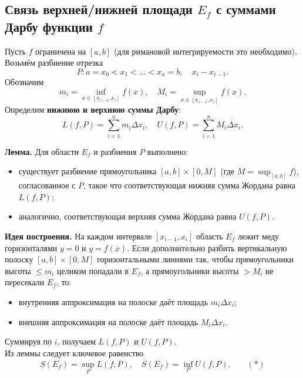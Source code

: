 \documentclass[14pt]{extreport}
\begin{document}
    \subsection{Связь верхней/нижней площади $E_f$ с суммами Дарбу функции $f$}
    Пусть $f$ ограничена на $[a,b]$ (для римановой интегрируемости это необходимо). Возьмём разбиение отрезка
    \[
    P: a = x_0 < x_1 < ... < x_n = b, \quad x_i - x_{i-1}.
    \]
    Обозначим
    \[
    m_i = \inf_{x \in [x_{i-1}, x_i]} f(x), \quad M_i = \sup_{x \in [x_{i-1},x_i]} f(x).
    \]
    Определим \textbf{нижнюю и верхнюю суммы Дарбу}:
    \[
    L(f,P) = \sum_{i=1}^n m_i \Delta x_i, \quad U(f,P) = \sum_{i=1}^n M_i \Delta x_i.
    \]
    \begin{theorem}
        \textbf{Лемма.} Для области $E_f$ и разбиения $P$ выполнено:
        \begin{itemize}
            \item существует разбиение прямоугольника $[a,b] \times [0,M]$ (где $M = \sup_{[a,b]} f$), согласованное с $P$, такое что соответствующая нижняя сумма Жордана равна $L(f,P)$;
            \item аналогично, соответствующая верхняя сумма Жордана равна $U(f,P)$.
        \end{itemize}
        \textbf{Идея построения.} На каждом интервале $[x_{i-1},x_i]$ область $E_f$ лежит меду горизонталями $y=0$ и $y=f(x)$. Если дополнительно разбить вертикальную полоску $[a,b] \times [0,M]$ горизонтальными линиями так, чтобы прямоугольники высоты $\leq m_i$ целиком попадали в $E_f$, а прямоугольники высоты $>M_i$ не пересекали $E_f$, то:
        \begin{itemize}
            \item внутренняя аппроксимация на полоске даёт площадь $m_i \Delta x_i$;
            \item внешняя аппроксимация на полоске даёт площадь $M_i \Delta x_i$.
        \end{itemize}
        Суммируя по $i$, получаем $L(f,P)$ и $U(f,P)$.\\
        Из леммы следует ключевое равенство
        \[
        \underline{S}(E_f) = \sup_P L(f,P), \quad \overline{S}(E_f) = \inf_P U(f,P). \qquad (*)
        \]
    \end{theorem}
\end{document}
